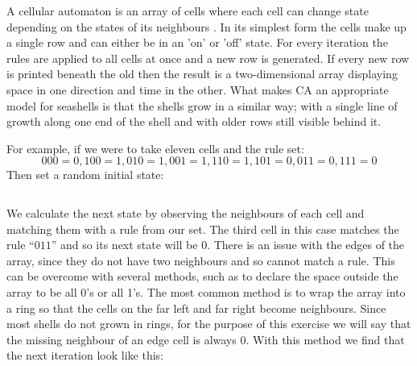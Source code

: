 \documentclass[a4paper,11pt]{report}
\begin{document}
A cellular automaton is an array of cells where each cell can change state depending on the states of its neighbours \cite{arsmith}. In its simplest form the cells make up a single row and can either be in an 'on' or 'off' state. For every iteration the rules are applied to all cells at once and a new row is generated. If every new row is printed beneath the old then the result is a two-dimensional array displaying space in one direction and time in the other. What makes CA an appropriate model for seashells is that the shells grow in a similar way; with a single line of growth along one end of the shell and with older rows still visible behind it.

For example, if we were to take eleven cells and the rule set:
\[000 = 0, 100 = 1, 010 = 1, 001 = 1, 110 = 1, 101 = 0, 011 = 0, 111 = 0 \]
Then set a random initial state:

\begin{center}
\begin{tabular}{|c|c|c|c|c|c|c|c|c|c|c|}
 \hline
 \cellcolor{black} & & \cellcolor{black} & \cellcolor{black} & & & & \cellcolor{black} & & \cellcolor{black} & \cellcolor{black} \\
 \hline
\end{tabular}
\end{center}

We calculate the next state by observing the neighbours of each cell and matching them with a rule from our set. The third cell in this case matches the rule ``$011$'' and so its next state will be $0$. There is an issue with the edges of the array, since they do not have two neighbours and so cannot match a rule. This can be overcome with several methods, such as to declare the space outside the array to be all 0's or all 1's. The most common method is to wrap the array into a ring so that the cells on the far left and far right become neighbours. Since most shells do not grown in rings, for the purpose of this exercise we will say that the missing neighbour of an edge cell is always 0. With this method we find that the next iteration look like this:

\begin{center}
\begin{tabular}{|c|c|c|c|c|c|c|c|c|c|c|}
 \hline
 \cellcolor{black} & & & \cellcolor{black} & \cellcolor{black} & & \cellcolor{black} & \cellcolor{black} & & & \cellcolor{black}\\
 \hline
 \end{tabular}
\end{center}
\end{document}
